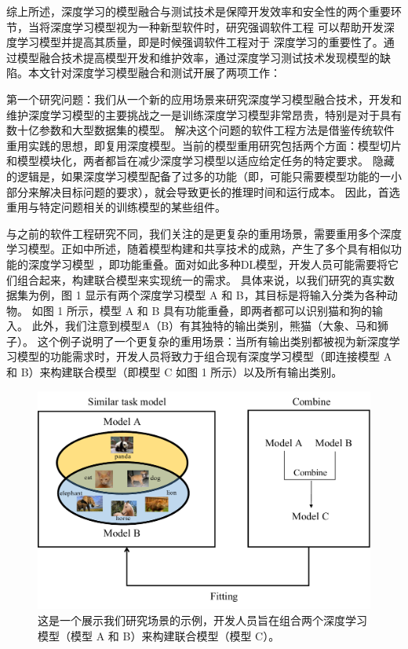 \documentclass[fontset=macnew,UTF8]{article} %
\begin{document}
综上所述，深度学习的模型融合与测试技术是保障开发效率和安全性的两个重要环节，当将深度学习模型视为一种新型软件时，研究强调软件工程 可以帮助开发深度学习模型并提高其质量，即是时候强调软件工程对于 深度学习\cite{menzies2019five}的重要性了。通过模型融合技术提高模型开发和维护效率，通过深度学习测试技术发现模型的缺陷。本文针对深度学习模型融合和测试开展了两项工作：

第一个研究问题：我们从一个新的应用场景来研究深度学习模型融合技术，开发和维护深度学习模型的主要挑战之一是训练深度学习模型非常昂贵，特别是对于具有数十亿参数和大型数据集的模型\cite{li2021modeldiff,shen2020mcp}。 解决这个问题的软件工程方法是借鉴传统软件重用实践的思想\cite{poulin1996measuring}，即复用深度模型\cite{pan2022decomposing,meng2021measuring}。当前的模型重用研究包括两个方面：模型切片\cite{zhang2022remos}和模型模块化\cite{pan2020decomposing,qi2022patching}，两者都旨在减少深度学习模型以适应给定任务的特定要求。 隐藏的逻辑是，如果深度学习模型配备了过多的功能（即，可能只需要模型功能的一小部分来解决目标问题的要求），就会导致更长的推理时间和运行成本。 因此，首选重用与特定问题相关的训练模型的某些组件\cite{qi2023reusing}。

与之前的软件工程研究不同，我们关注的是更复杂的重用场景，需要重用多个深度学习模型。正如\cite{meng2021measuring}中所述，随着模型构建和共享技术的成熟，产生了多个具有相似功能的深度学习模型 ，即功能重叠。面对如此多种DL模型，开发人员可能需要将它们组合起来，构建联合模型来实现统一的需求。 具体来说，以我们研究的真实数据集为例，图 1 显示有两个深度学习模型 A 和 B，其目标是将输入分类为各种动物。 如图 1 所示，模型 A 和 B 具有功能重叠，即两者都可以识别猫和狗的输入。 此外，我们注意到模型A（B）有其独特的输出类别，熊猫（大象、马和狮子）。 这个例子说明了一个更复杂的重用场景：当所有输出类别都被视为新深度学习模型的功能需求时，开发人员将致力于组合现有深度学习模型（即连接模型 A 和 B）来构建联合模型（即模型 C 如图 1 所示）以及所有输出类别。

\begin{figure}[h]
	\centering
	\includegraphics[width=0.5\linewidth]{MCCP_scene.pdf}
	\caption{这是一个展示我们研究场景的示例，开发人员旨在组合两个深度学习模型（模型 A 和 B）来构建联合模型（模型 C）。}
	\label{MCCP}
\end{figure}
\end{document}
